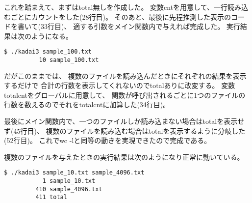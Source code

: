 \documentclass[12pt]{jarticle}
\begin{document}
これを踏まえて、まずはtotal無しを作成した。
変数cntを用意して、一行読み込むごとにカウントをした(28行目)。
そのあと、最後に先程推測した表示のコードを書いて(33行目)、
適する引数をメイン関数内で与えれば完成した。
実行結果は次のようになる。
\begin{lstlisting}[style = lstbash]
    $ ./kadai3 sample_100.txt
          10 sample_100.txt
\end{lstlisting}

だがこのままでは、
複数のファイルを読み込んだときにそれぞれの結果を表示するだけで
合計の行数を表示してくれないのでtotalありに改変する。
変数totalcntをグローバルに用意して、
関数が呼び出されるごとに1つのファイルの行数を数えるのでそれをtotalcntに加算した(34行目)。

最後にメイン関数内で、一つのファイルしか読み込まない場合はtotalを表示せず(45行目)、
複数のファイルを読み込む場合はtotalを表示するように分岐した(52行目)。
これでwc -lと同等の動きを実現できたので完成である。

複数のファイルを与えたときの実行結果は次のようになり正常に動いている。
\begin{lstlisting}[style = lstbash]
    $ ./kadai3 sample_10.txt sample_4096.txt
           1 sample_10.txt
         410 sample_4096.txt
         411 total
\end{lstlisting}

\clearpage
\end{document}

